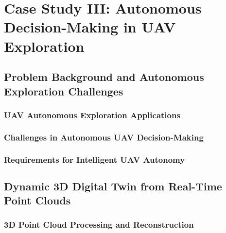 
\chapter{Case Study III: Autonomous Decision-Making in UAV Exploration} \label{chp:uav}


\section{Problem Background and Autonomous Exploration Challenges}

\subsection{UAV Autonomous Exploration Applications}

\subsection{Challenges in Autonomous UAV Decision-Making}

\subsection{Requirements for Intelligent UAV Autonomy}

\section{Dynamic 3D Digital Twin from Real-Time Point Clouds}

\subsection{3D Point Cloud Processing and Reconstruction}

